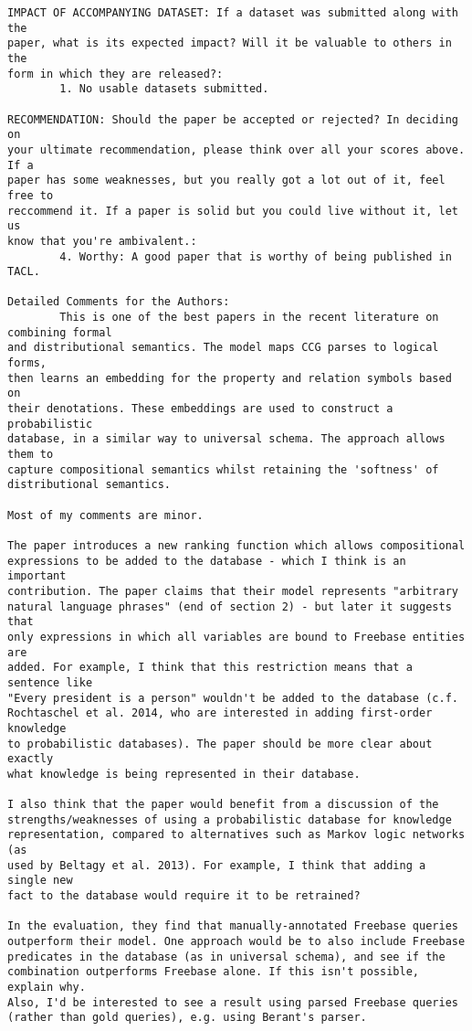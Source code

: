 \documentclass{article}[11pt,oneside]
\begin{document}
\begin{verbatim}
IMPACT OF ACCOMPANYING DATASET: If a dataset was submitted along with the
paper, what is its expected impact? Will it be valuable to others in the
form in which they are released?:
        1. No usable datasets submitted.

RECOMMENDATION: Should the paper be accepted or rejected? In deciding on
your ultimate recommendation, please think over all your scores above. If a
paper has some weaknesses, but you really got a lot out of it, feel free to
reccommend it. If a paper is solid but you could live without it, let us
know that you're ambivalent.:
        4. Worthy: A good paper that is worthy of being published in TACL.

Detailed Comments for the Authors:
        This is one of the best papers in the recent literature on combining formal
and distributional semantics. The model maps CCG parses to logical forms,
then learns an embedding for the property and relation symbols based on
their denotations. These embeddings are used to construct a probabilistic
database, in a similar way to universal schema. The approach allows them to
capture compositional semantics whilst retaining the 'softness' of
distributional semantics.

Most of my comments are minor.

The paper introduces a new ranking function which allows compositional
expressions to be added to the database - which I think is an important
contribution. The paper claims that their model represents "arbitrary
natural language phrases" (end of section 2) - but later it suggests that
only expressions in which all variables are bound to Freebase entities are
added. For example, I think that this restriction means that a sentence like
"Every president is a person" wouldn't be added to the database (c.f.
Rochtaschel et al. 2014, who are interested in adding first-order knowledge
to probabilistic databases). The paper should be more clear about exactly
what knowledge is being represented in their database.

I also think that the paper would benefit from a discussion of the
strengths/weaknesses of using a probabilistic database for knowledge
representation, compared to alternatives such as Markov logic networks (as
used by Beltagy et al. 2013). For example, I think that adding a single new
fact to the database would require it to be retrained?

In the evaluation, they find that manually-annotated Freebase queries
outperform their model. One approach would be to also include Freebase
predicates in the database (as in universal schema), and see if the
combination outperforms Freebase alone. If this isn't possible, explain why.
Also, I'd be interested to see a result using parsed Freebase queries
(rather than gold queries), e.g. using Berant's parser.


\end{verbatim}
\end{document}
